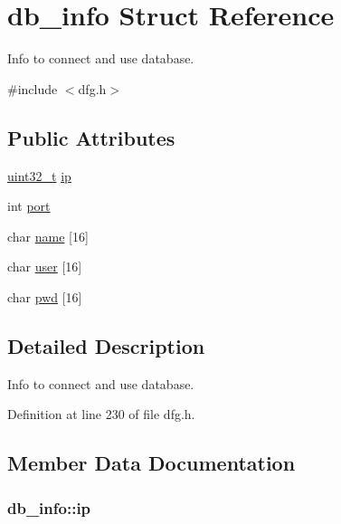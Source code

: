 \hypertarget{structdb__info}{\section{db\-\_\-info Struct Reference}
\label{structdb__info}
}


Info to connect and use database.  




{\ttfamily \#include $<$dfg.\-h$>$}

\subsection*{Public Attributes}
\begin{DoxyCompactItemize}
\item 
\hyperlink{msus_2webserver_2uthash_8h_a435d1572bf3f880d55459d9805097f62}{uint32\-\_\-t} \hyperlink{structdb__info_aba75067e46a9527b5b20a89a6a23c150}{ip}
\item 
int \hyperlink{structdb__info_ac425055e92c9cb6184e59126de818c25}{port}
\item 
char \hyperlink{structdb__info_a753b946bdb75a251d7c277feeddf6722}{name} \mbox{[}16\mbox{]}
\item 
char \hyperlink{structdb__info_a7c2c04a11003ece96e0cdbf3e1e27c60}{user} \mbox{[}16\mbox{]}
\item 
char \hyperlink{structdb__info_a498110579dc8f32bed3f6589ddc6d3cb}{pwd} \mbox{[}16\mbox{]}
\end{DoxyCompactItemize}


\subsection{Detailed Description}
Info to connect and use database. 

Definition at line 230 of file dfg.\-h.



\subsection{Member Data Documentation}
\hypertarget{structdb__info_aba75067e46a9527b5b20a89a6a23c150}{
\subsubsection[{ip}]{ db\-\_\-info\-::ip}}\label{structdb__info_aba75067e46a9527b5b20a89a6a23c150}


